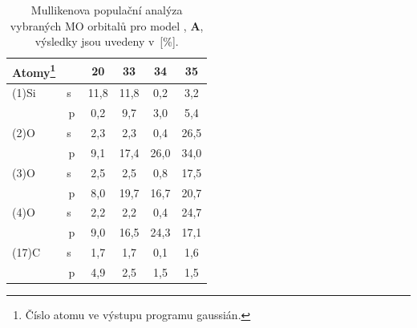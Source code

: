 \documentclass[
digital, %
table,   %
lof,     %
lot,     %
oneside,
]{fithesis3}
\begin{document}
\begin{table}[H]\begin{minipage}{\textwidth}
\caption{Mullikenova populační analýza vybraných MO orbitalů pro model , \textbf{A}, výsledky jsou uvedeny v~[\%].}
\begin{center}
\begin{tabular}{|l|c|c|c|c|c|}
\hline
Atomy\footnote{Číslo atomu ve výstupu programu gaussián.} \label{si_ch3_och3_MPA}&  & 20 & 33 & 34 & 35 \\ \hline
(1)Si & s~& 11,8 & 11,8 & 0,2 & 3,2 \\ \hline
& p & 0,2 & 9,7 & 3,0 & 5,4 \\ \hline
(2)O & s~& 2,3 & 2,3 & 0,4 & 26,5 \\ \hline
& p & 9,1 & 17,4 & 26,0 & 34,0 \\ \hline
(3)O & s~& 2,5 & 2,5 & 0,8 & 17,5 \\ \hline
& p & 8,0 & 19,7 & 16,7 & 20,7 \\ \hline
(4)O & s~& 2,2 & 2,2 & 0,4 & 24,7 \\ \hline
& p & 9,0 & 16,5 & 24,3 & 17,1 \\ \hline
(17)C & s~& 1,7 & 1,7 & 0,1 & 1,6 \\ \hline
& p & 4,9 & 2,5 & 1,5 & 1,5 \\ \hline
\end{tabular}
\end{center}
\end{minipage}
\end{table}
\end{document}
